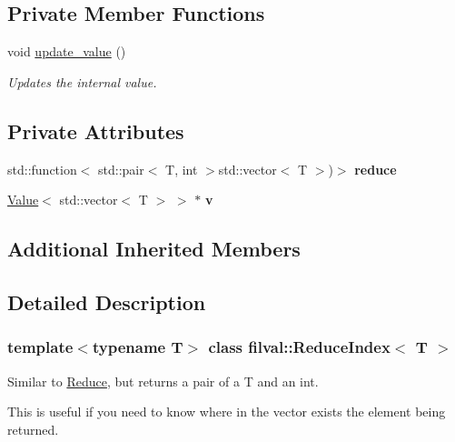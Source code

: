 \subsection*{Private Member Functions}
\begin{DoxyCompactItemize}
\item 
void \hyperlink{classfilval_1_1ReduceIndex_a9c842f80d772c4c77cd3fe132a0f8730}{update\+\_\+value} ()
\begin{DoxyCompactList}\small\item\em Updates the internal value. \end{DoxyCompactList}\end{DoxyCompactItemize}
\subsection*{Private Attributes}
\begin{DoxyCompactItemize}
\item 
\hypertarget{classfilval_1_1ReduceIndex_a8051a7beba20dfb9cbe6476559edb07d}{}\label{classfilval_1_1ReduceIndex_a8051a7beba20dfb9cbe6476559edb07d} 
std\+::function$<$ std\+::pair$<$ T, int $>$std\+::vector$<$ T $>$)$>$ {\bfseries reduce}
\item 
\hypertarget{classfilval_1_1ReduceIndex_a9e9c0c76aa470492b3a3774c198d597b}{}\label{classfilval_1_1ReduceIndex_a9e9c0c76aa470492b3a3774c198d597b} 
\hyperlink{classfilval_1_1Value}{Value}$<$ std\+::vector$<$ T $>$ $>$ $\ast$ {\bfseries v}
\end{DoxyCompactItemize}
\subsection*{Additional Inherited Members}


\subsection{Detailed Description}
\subsubsection*{template$<$typename T$>$\newline
class filval\+::\+Reduce\+Index$<$ T $>$}

Similar to \hyperlink{classfilval_1_1Reduce}{Reduce}, but returns a pair of a T and an int. 

This is useful if you need to know where in the vector exists the element being returned. 

